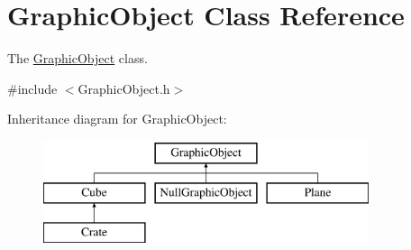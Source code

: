 \hypertarget{classGraphicObject}{}\section{Graphic\+Object Class Reference}
\label{classGraphicObject}


The \hyperlink{classGraphicObject}{Graphic\+Object} class.  




{\ttfamily \#include $<$Graphic\+Object.\+h$>$}

Inheritance diagram for Graphic\+Object\+:\begin{figure}[H]
\begin{center}
\leavevmode
\includegraphics[height=3.000000cm]{classGraphicObject}
\end{center}
\end{figure}
